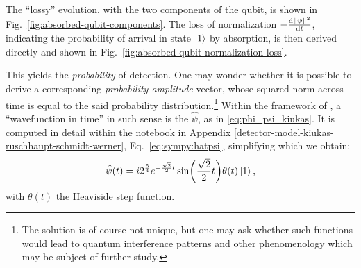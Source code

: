 The ``lossy'' evolution, with the two components of the qubit, is shown in Fig.~\ref{fig:absorbed-qubit-components}.
The loss of normalization $-\dv{\norm{\psi}^2}{t}$, indicating the probability of arrival in state $\ket{1}$ by absorption,
is then derived directly and shown in Fig.~\ref{fig:absorbed-qubit-normalization-loss}.

This yields the \emph{probability} of detection.
One may wonder whether it is possible to derive a corresponding \emph{probability amplitude} vector,
whose squared norm across time is equal to the said probability distribution.\footnote{
  The solution is of course not unique, but one may ask whether such functions would lead
  to quantum interference patterns and other phenomenology which may be subject of further study.
}
Within the framework of \cite{RuschhauptAbsorption}, a ``wavefunction in time'' in such sense
is the $\hat{\psi}$, as in \eqref{eq:phi_psi_kiukas}.
It is computed in detail within the
notebook in Appendix \ref{detector-model-kiukas-ruschhaupt-schmidt-werner}, Eq.~\eqref{eq:sympy:hatpsi},
simplifying which we obtain:
\begin{equation}\label{eq:analytic:hatpsi}
  \hat{\psi}(t) =
    i 2^{\frac{5}{4}} e^{-\frac{\sqrt{2}}{2}t}\sin(\frac{\sqrt{2}}{2}t) \theta(t)
    \ket{1}
    \text{,}
\end{equation}
with $\theta(t)$ the Heaviside step function.


